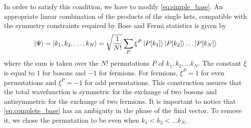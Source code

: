 In order to satisfy this condition, we have to modify \cref{eq:simple_base}. An appropriate linear combination of the products of the single kets, compatible with the symmetry constraints required by Bose and Fermi statistics is given by
\begin{equation} \label{eq:complete_base}
    \ket{\Psi} = \ket{k_1, k_2, \dots, k_N} = \sqrt{\frac{1}{N!}} \sum_P \xi^P \ket{P[k_1]}\ket{P[k_2]}\dots\ket{P[k_N]}
\end{equation}
where the sum is taken over the $N!$ permutations $P$ of ${k_1, k_2, \dots k_N}$. The constant $\xi$ is equal to $1$ for bosons and $-1$ for fermions. For fermions, $\xi^P = 1$ for even permutations and $\xi^P = -1$ for odd permutations. This construction assures that the total wavefunction is symmetric for the exchange of two bosons and antisymmetric for the exchange of two fermions. It is important to notice that \cref{eq:complete_base} has an ambiguity in the phase of the final vector. To remove it, we chose the permutation to be even when $k_1 < k_2 < \dots k_N$.

